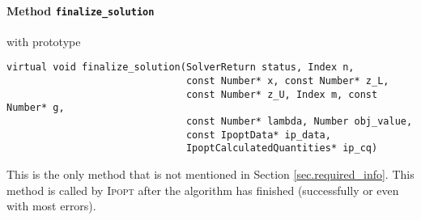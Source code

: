 \documentclass[10pt]{article}
\newcommand{\Ipopt}{\textsc{Ipopt}\xspace}
\begin{document}
\paragraph{Method \texttt{finalize\_solution}} with prototype

\begin{verbatim}
virtual void finalize_solution(SolverReturn status, Index n,
                               const Number* x, const Number* z_L,
                               const Number* z_U, Index m, const Number* g,
                               const Number* lambda, Number obj_value,
                               const IpoptData* ip_data,
                               IpoptCalculatedQuantities* ip_cq)
\end{verbatim}
This is the only method that is not mentioned in Section
\ref{sec.required_info}. This method is called by \Ipopt after the
algorithm has finished (successfully or even with most errors).
\end{document}
